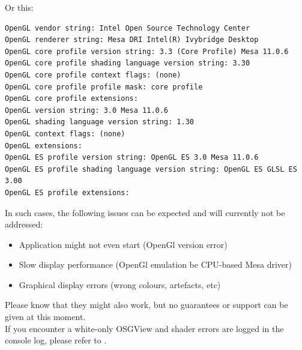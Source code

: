 Or this:

\begin{lstlisting}
OpenGL vendor string: Intel Open Source Technology Center
OpenGL renderer string: Mesa DRI Intel(R) Ivybridge Desktop 
OpenGL core profile version string: 3.3 (Core Profile) Mesa 11.0.6
OpenGL core profile shading language version string: 3.30
OpenGL core profile context flags: (none)
OpenGL core profile profile mask: core profile
OpenGL core profile extensions:
OpenGL version string: 3.0 Mesa 11.0.6
OpenGL shading language version string: 1.30
OpenGL context flags: (none)
OpenGL extensions:
OpenGL ES profile version string: OpenGL ES 3.0 Mesa 11.0.6
OpenGL ES profile shading language version string: OpenGL ES GLSL ES 3.00
OpenGL ES profile extensions:
\end{lstlisting}

In such cases, the following issues can be expected and will currently not be addressed:

\begin{itemize} 
\item Application might not even start (OpenGl version error)
\item Slow display performance (OpenGl emulation be CPU-based Mesa driver)
\item Graphical display errors (wrong colours, artefacts, etc) 
\end{itemize} 

Please know that they might also work, but no guarantees or support can be given at this moment. \\

If you encounter a white-only OSGView and shader errors are logged in the console log, please refer to .


